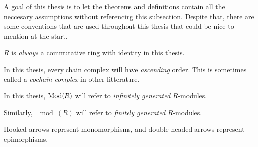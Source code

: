 A goal of this thesis is to let the theorems and definitions contain all the neccesary assumptions without referencing this subsection. Despite that, there are some conventions that are used throughout this thesis that could be nice to mention at the start.

\begin{notation}
    \( R \) is \emph{always} a commutative ring with identity in this thesis.
\end{notation}

\begin{notation}
    In this thesis, every chain complex will have \emph{ascending} order. This is sometimes called a \emph{cochain complex} in other litterature.
\end{notation}

\begin{notation}
    In this thesis, \( \operatorname{Mod}(R) \) will refer to \emph{infinitely generated} \( R \)-modules.

    Similarly, \( \mod(R) \) will refer to \emph{finitely generated} \( R \)-modules.
\end{notation}

\begin{notation}
    Hooked arrows represent monomorphisms, and double-headed arrows represent epimorphisms.
\end{notation}